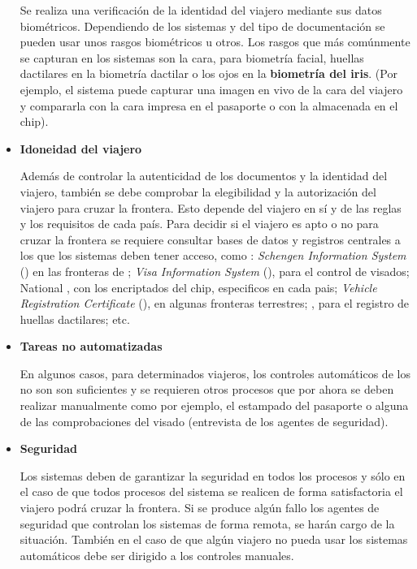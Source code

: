 \begin{itemize}
    Se realiza una verificación de la identidad del viajero mediante sus datos biométricos. Dependiendo de los sistemas y del tipo de documentación se pueden usar unos rasgos biométricos u otros. Los rasgos que más comúnmente se capturan en los sistemas  son la cara, para biometría \gls{facial}, huellas dactilares en la biometría \gls{dactilar} o los ojos en la \textbf{biometría del \gls{iris}}. (Por ejemplo, el sistema puede capturar una imagen en vivo de la cara del viajero y compararla con la cara impresa en el pasaporte o con la almacenada en el chip).
    
    \item
    \textbf{Idoneidad del viajero}
    
    Además de controlar la autenticidad de los documentos y la identidad del viajero, también se debe comprobar la elegibilidad y la autorización del viajero para cruzar la frontera. Esto depende del viajero en sí y de las reglas y los requisitos de cada país.  
    Para decidir si el viajero es apto o no para cruzar la frontera se requiere consultar bases de datos y registros centrales a los que los sistemas  deben tener acceso, como : \textit{Schengen Information System} (\textbf{}) en las fronteras de ; \textit{Visa Information System} (\textbf{}), para el control de visados; National , con los encriptados del chip, especificos en cada pais; \textit{Vehicle Registration Certificate} (), en algunas fronteras terrestres; , para el registro de huellas dactilares; etc. %

    \item
    \textbf{Tareas no automatizadas}
    
    En algunos casos, para determinados viajeros, los controles automáticos de los  no son son suficientes y se requieren otros procesos que por ahora se deben realizar manualmente como por ejemplo, el estampado del pasaporte o alguna de las comprobaciones del visado (entrevista de los agentes de seguridad). 

    \item
    \textbf{Seguridad}
    
    Los sistemas deben de garantizar la seguridad en todos los procesos y sólo en el caso de que todos procesos del sistema  se realicen de forma satisfactoria el viajero podrá cruzar la frontera. Si se produce algún fallo los agentes de seguridad que controlan los sistemas de forma remota, se harán cargo de la situación. También en el caso de que algún viajero no pueda usar los sistemas automáticos debe ser dirigido a los controles manuales.

\end{itemize}


